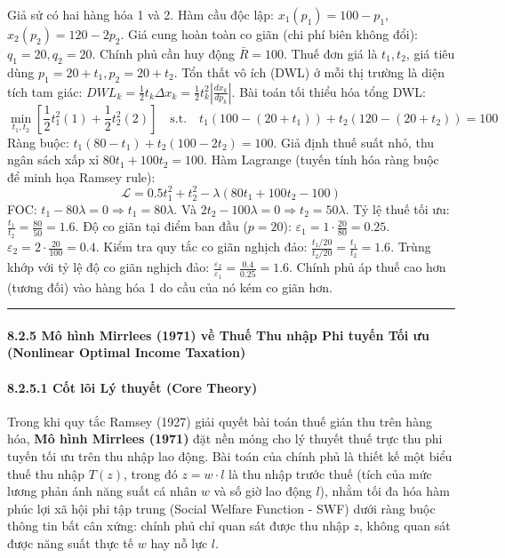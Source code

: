 \documentclass[
]{article}
\begin{document}
Giả sử có hai hàng hóa 1 và 2. Hàm cầu độc lập:
\(x_1(p_1) = 100 - p_1\), \(x_2(p_2) = 120 - 2p_2\). Giá cung hoàn toàn
co giãn (chi phí biên không đổi): \(q_1 = 20, q_2 = 20\). Chính phủ cần
huy động \(\bar{R} = 100\). Thuế đơn giá là \(t_1, t_2\), giá tiêu dùng
\(p_1 = 20+t_1, p_2 = 20+t_2\). Tổn thất vô ích (DWL) ở mỗi thị trường
là diện tích tam giác:
\(DWL_k = \frac{1}{2} t_k \Delta x_k = \frac{1}{2} t_k^2 |\frac{dx_k}{dp_k}|\).
Bài toán tối thiểu hóa tổng DWL:
\[ \min_{t_1, t_2} \left[ \frac{1}{2} t_1^2 (1) + \frac{1}{2} t_2^2 (2) \right] \quad \text{s.t.} \quad t_1(100 - (20+t_1)) + t_2(120 - (20+t_2)) = 100 \]
Ràng buộc: \(t_1(80 - t_1) + t_2(100 - 2t_2) = 100\). Giả định thuế suất
nhỏ, thu ngân sách xấp xỉ \(80t_1 + 100t_2 = 100\). Hàm Lagrange (tuyến
tính hóa ràng buộc để minh họa Ramsey rule):
\[ \mathcal{L} = 0.5 t_1^2 + t_2^2 - \lambda (80t_1 + 100t_2 - 100) \]
FOC: \(t_1 - 80\lambda = 0 \Rightarrow t_1 = 80\lambda\). Và
\(2t_2 - 100\lambda = 0 \Rightarrow t_2 = 50\lambda\). Tỷ lệ thuế tối
ưu: \(\frac{t_1}{t_2} = \frac{80}{50} = 1.6\). Độ co giãn tại điểm ban
đầu (\(p=20\)): \(\varepsilon_1 = 1 \cdot \frac{20}{80} = 0.25\).
\(\varepsilon_2 = 2 \cdot \frac{20}{100} = 0.4\). Kiểm tra quy tắc co
giãn nghịch đảo: \(\frac{t_1 / 20}{t_2 / 20} = \frac{t_1}{t_2} = 1.6\).
Trùng khớp với tỷ lệ độ co giãn nghịch đảo:
\(\frac{\varepsilon_2}{\varepsilon_1} = \frac{0.4}{0.25} = 1.6\). Chính
phủ áp thuế cao hơn (tương đối) vào hàng hóa 1 do cầu của nó kém co giãn
hơn.

\begin{center}\rule{0.5\linewidth}{0.5pt}\end{center}

\paragraph{8.2.5 Mô hình Mirrlees (1971) về Thuế Thu nhập Phi tuyến Tối
ưu (Nonlinear Optimal Income
Taxation)}\label{muxf4-huxecnh-mirrlees-1971-vux1ec1-thuux1ebf-thu-nhux1eadp-phi-tuyux1ebfn-tux1ed1i-ux1b0u-nonlinear-optimal-income-taxation}

\paragraph{8.2.5.1 Cốt lõi Lý thuyết (Core
Theory)}\label{cux1ed1t-luxf5i-luxfd-thuyux1ebft-core-theory-26}

Trong khi quy tắc Ramsey (1927) giải quyết bài toán thuế gián thu trên
hàng hóa, \textbf{Mô hình Mirrlees (1971)} đặt nền móng cho lý thuyết
thuế trực thu phi tuyến tối ưu trên thu nhập lao động. Bài toán của
chính phủ là thiết kế một biểu thuế thu nhập \(T(z)\), trong đó
\(z = w \cdot l\) là thu nhập trước thuế (tích của mức lương phản ánh
năng suất cá nhân \(w\) và số giờ lao động \(l\)), nhằm tối đa hóa hàm
phúc lợi xã hội phi tập trung (Social Welfare Function - SWF) dưới ràng
buộc thông tin bất cân xứng: chính phủ chỉ quan sát được thu nhập \(z\),
không quan sát được năng suất thực tế \(w\) hay nỗ lực \(l\).
\end{document}
